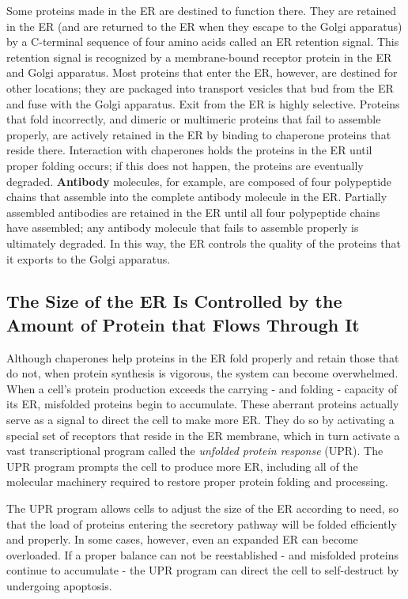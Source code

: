Some proteins made in the ER are destined to function there. They are
retained in the ER (and are returned to the ER when they escape to the
Golgi apparatus) by a C-terminal sequence of four amino acids called
an ER retention signal. This retention signal is
recognized by a membrane-bound receptor protein in the ER and Golgi
apparatus. Most proteins that enter the ER, however, are destined for
other locations; they are packaged into transport vesicles that bud from
the ER and fuse with the Golgi apparatus. Exit from the ER is highly selective. 
Proteins that fold incorrectly, and dimeric or multimeric proteins that
fail to assemble properly, are actively retained in the ER by binding to
chaperone proteins that reside there. Interaction with chaperones holds
the proteins in the ER until proper folding occurs; if this does not happen,
the proteins are eventually degraded. \textbf{Antibody} molecules,
for example, are composed of four polypeptide chains
that assemble into the complete antibody molecule in the ER. Partially
assembled antibodies are retained in the ER until all four polypeptide
chains have assembled; any antibody molecule that fails to assemble
properly is ultimately degraded. In this way, the ER controls the quality of
the proteins that it exports to the Golgi apparatus.

\subsection{The Size of the ER Is Controlled by the Amount of Protein that Flows Through It}

Although chaperones help proteins in the ER fold properly and retain those
that do not, when protein synthesis is vigorous, the system can become
overwhelmed. When a cell’s protein production exceeds the carrying - 
and folding - capacity of its ER, misfolded proteins begin to accumulate.
These aberrant proteins actually serve as a signal to direct the cell to make
more ER. They do so by activating a special set of receptors that reside in
the ER membrane, which in turn activate a vast transcriptional program
called the \textit{unfolded protein response} (UPR). The UPR program prompts
the cell to produce more ER, including all of the molecular machinery
required to restore proper protein folding and processing.

The UPR program allows cells to adjust the size of the ER according to
need, so that the load of proteins entering the secretory pathway will be
folded efficiently and properly. In some cases, however, even an expanded
ER can become overloaded. If a proper balance can not be reestablished - 
and misfolded proteins continue to accumulate - the UPR program can
direct the cell to self-destruct by undergoing apoptosis.

